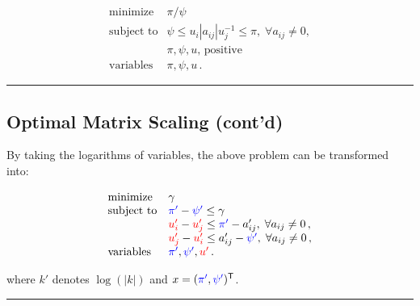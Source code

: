 \documentclass[
]{article}
\begin{document}
\[\begin{array}{ll}
  \text{minimize}   &   \pi/\psi  \\
  \text{subject to} &   \psi \le u_i |a_{ij}| u_j^{-1} \le \pi, \; \forall a_{ij} \neq 0 , \\
                    &   \pi, \psi, u, \, \text{positive} \\
  \text{variables}  &   \pi, \psi, u \, .
  \end{array}\]

\begin{center}\rule{0.5\linewidth}{0.5pt}\end{center}

\subsection{Optimal Matrix Scaling
(cont'd)}\label{optimal-matrix-scaling-contd}

By taking the logarithms of variables, the above problem can be
transformed into:

\[\begin{array}{ll}
  \text{minimize}   &   \gamma \\
  \text{subject to} &   {\color{blue}\pi'} - {\color{blue}\psi'} \le \gamma \\
                    &   {\color{red}u_i'} - {\color{red}u_j'}  \le {\color{blue}\pi'} - a_{ij}', \; \forall a_{ij} \neq 0 \,, \\
                    &   {\color{red}u_j'} - {\color{red}u_i'} \le a_{ij}' - {\color{blue}\psi'}, \; \forall a_{ij} \neq 0 \,, \\
  \text{variables}  &   {\color{blue}\pi'}, {\color{blue}\psi'}, {\color{red}u'} \, .
  \end{array}\]

where \(k'\) denotes \(\log( | k | )\) and
\(x = ({\color{blue}\pi'}, {\color{blue}\psi'} )^\mathsf{T}\).

\begin{center}\rule{0.5\linewidth}{0.5pt}\end{center}
\end{document}
